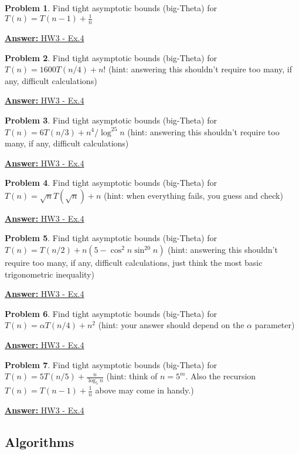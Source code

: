 \documentclass[12pt]{article}
\theoremstyle{definition}
\newtheorem{practiceproblem}{Problem}[section]
\def\scratchwork{\vspace*{15em}} %
\def\psetthree{https://github.com/zacktraczyk/CSE102-Midterm-Study-Guide/blob/main/hw\%20answers/vaggos\_W\_24\_CSE102\_01\_PSET\_3\_solutions.pdf}
\newenvironment{problem}[2]
{
	\def\linktext{#1}
	\def\linkdest{#2}
	\noindent \begin{minipage}{\textwidth}
		\begin{practiceproblem}
}
{	
		\end{practiceproblem}
		\href{\linkdest}{\textbf{Answer:} \linktext}
		\scratchwork
	\end{minipage}
}
\begin{document}
	\begin{problem}{HW3 - Ex.4}{\psetthree}
		Find tight asymptotic bounds
		(big-Theta) for
		$T(n)=T(n-1)+\frac1n$
	\end{problem}

	\begin{problem}{HW3 - Ex.4}{\psetthree}
		Find tight asymptotic bounds
		(big-Theta) for
		$T(n)=1600T(n/4)+n!$ (hint: answering this shouldn't require too many,
		if any, difficult calculations)
	\end{problem}

	\begin{problem}{HW3 - Ex.4}{\psetthree}
		Find tight asymptotic bounds
		(big-Theta) for
		$T(n)=6T(n/3)+n^4/\log^{25} n$ (hint: answering this shouldn't require
		too many, if any, difficult calculations)
	\end{problem}

	\begin{problem}{HW3 - Ex.4}{\psetthree}
		Find tight asymptotic bounds
		(big-Theta) for
		$T(n)=\sqrt n T(\sqrt{n}) + n$ (hint: when everything fails, you guess
		and check)
	\end{problem}

	\begin{problem}{HW3 - Ex.4}{\psetthree}
		Find tight asymptotic bounds
		(big-Theta) for
		$T(n)=T(n/2)+n(5-\cos^2n\sin^{20}n)$ (hint: answering this shouldn't
		require too many, if any, difficult calculations, just think the most
		basic trigonometric inequality)
	\end{problem}

	\begin{problem}{HW3 - Ex.4}{\psetthree}
		Find tight asymptotic bounds
		(big-Theta) for
		$T(n)=\alpha T(n/4)+n^2$ (hint: your answer should depend on the
		$\alpha$ parameter)
	\end{problem}

	\begin{problem}{HW3 - Ex.4}{\psetthree}
		Find tight asymptotic bounds
		(big-Theta) for
		$T(n)=5T(n/5) +\frac{n}{\log_5 n}$ (hint: think of $n=5^m$. Also the
		recursion $T(n)=T(n-1)+\frac1n$ above may come in handy.)
	\end{problem}

	\subsection{Algorithms}
\end{document}
